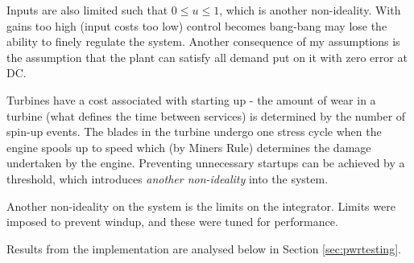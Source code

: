Inputs are also limited such that $ 0 \leq u \leq 1$, which is another non-ideality.
With gains too high (input costs too low) control becomes bang-bang may lose the ability to finely regulate the system.
Another consequence of my assumptions is the assumption that the plant can satisfy all demand put on it with zero error at DC.

Turbines have a cost associated with starting up - the amount of wear in a turbine (what defines the time between services) is determined by the number of spin-up events.
The blades in the turbine undergo one stress cycle when the engine spools up to speed which (by Miners Rule) determines the damage undertaken by the engine.
Preventing unnecessary startups can be achieved by a threshold, which introduces \emph{another non-ideality} into the system.

Another non-ideality on the system is the limits on the integrator.
Limits were imposed to prevent windup, and these were tuned for performance.

Results from the implementation are analysed below in Section \ref{sec:pwrtesting}.
